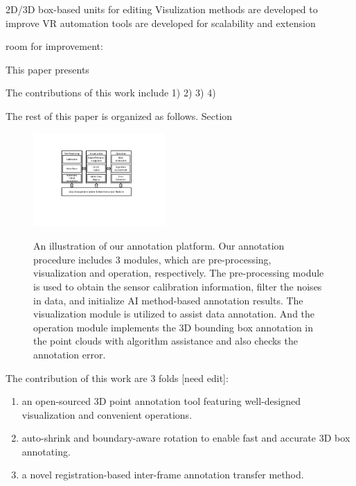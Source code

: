 \documentclass[letterpaper, 10 pt, conference]{ieeeconf}  %
\begin{document}
2D/3D box-based units for editing 
Visulization methods are developed to improve VR
automation tools are developed for scalability and extension 

room for improvement: 

This paper presents 

The contributions of this work include
1)
2)
3)
4)

The rest of this paper is organized as follows. Section



\begin{figure}[htbp]
	\centering
	\includegraphics[width=0.45\textwidth]{./figures/arch}\\ %
	\caption{An illustration of our annotation platform. Our annotation procedure includes 3 modules, which are pre-processing, visualization and operation, respectively. The pre-processing module is used to obtain the sensor calibration information, filter the noises in data, and initialize AI method-based annotation results. The visualization module is utilized to assist data annotation. And the operation module implements the 3D bounding box annotation in the point clouds with algorithm assistance and also checks the annotation error.}
	\label{fig:main-arch}
	\vspace{-0.3cm}
\end{figure}



The  contribution of this work are 3 folds [need edit]:
\begin{enumerate}
	\item an open-sourced 3D point annotation tool featuring  well-designed visualization and convenient operations.
	\item auto-shrink and boundary-aware rotation to enable fast and accurate 3D box annotating.
	\item a novel registration-based inter-frame annotation transfer method.
\end{enumerate}
\end{document}
